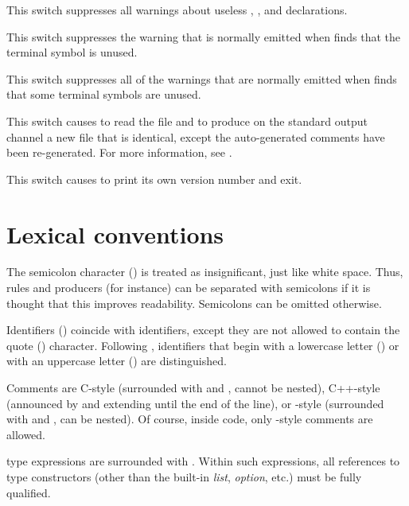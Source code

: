 \documentclass[onecolumn,11pt,nocopyrightspace,preprint]{sigplanconf}
\begin{document}
\docswitch{\oignoreprec} This switch suppresses all warnings about
useless \dleft, \dright, \dnonassoc and \dprec declarations.

 This switch suppresses the warning that
is normally emitted when \menhir finds that the terminal symbol  is
unused.

\docswitch{\oignoreall} This switch suppresses all of the warnings that are
normally emitted when \menhir finds that some terminal symbols are unused.

 This switch causes \menhir to
read the \messages file  and to produce on the standard output
channel a new \messages file that is identical, except the auto-generated
comments have been re-generated. For more information,
see .

\docswitch{\oversion} This switch causes \menhir to print its own version
number and exit.


\section{Lexical conventions}

The semicolon character (\kw{;}) is treated as insignificant, just like white
space. Thus, rules and producers (for instance) can be separated with
semicolons if it is thought that this improves readability. Semicolons can be
omitted otherwise.

Identifiers () coincide with \ocaml identifiers, except they are not
allowed to contain the quote () character. Following
\ocaml, identifiers that begin with a lowercase letter
() or with an uppercase letter () are distinguished.

Comments are C-style (surrounded with \kw{/*} and \kw{*/}, cannot be nested),
C++-style (announced by \kw{/$\!$/} and extending until the end of the line), or
\ocaml-style (surrounded with \kw{(*} and \kw{*)}, can be nested). Of course,
inside \ocaml code, only \ocaml-style comments are allowed.

\ocaml type expressions are surrounded with . Within such expressions,
all references to type constructors (other than the built-in \textit{list}, \textit{option}, etc.)
must be fully qualified.

\end{document}
